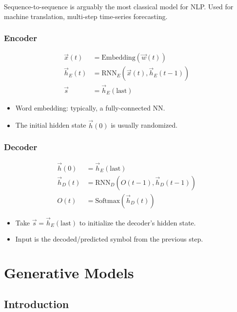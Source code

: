 \documentclass[11pt,a4paper]{article}
\begin{document}
Sequence-to-sequence is arguably the most classical model for NLP. Used for machine translation, multi-step time-series forecasting.

\subsubsection{Encoder}

\begin{align*}
\vec{x}(t) &= \text{Embedding}(\vec{w}(t)) \\
\vec{h}_E(t) &= \text{RNN}_E(\vec{x}(t), \vec{h}_E(t-1)) \\
\vec{s} &= \vec{h}_E(\text{last})
\end{align*}

\begin{itemize}[leftmargin=*]
    \item Word embedding: typically, a fully-connected NN.
    \item The initial hidden state $\vec{h}(0)$ is usually randomized.
\end{itemize}

\subsubsection{Decoder}

\begin{align*}
\vec{h}(0) &= \vec{h}_E(\text{last}) \\
\vec{h}_D(t) &= \text{RNN}_D(O(t-1), \vec{h}_D(t-1)) \\
O(t) &= \text{Softmax}(\vec{h}_D(t))
\end{align*}

\begin{itemize}[leftmargin=*]
    \item Take $\vec{s} = \vec{h}_E(\text{last})$ to initialize the decoder's hidden state.
    \item Input is the decoded/predicted symbol from the previous step.
\end{itemize}

\newpage
\section{Generative Models}

\subsection{Introduction}
\end{document}
